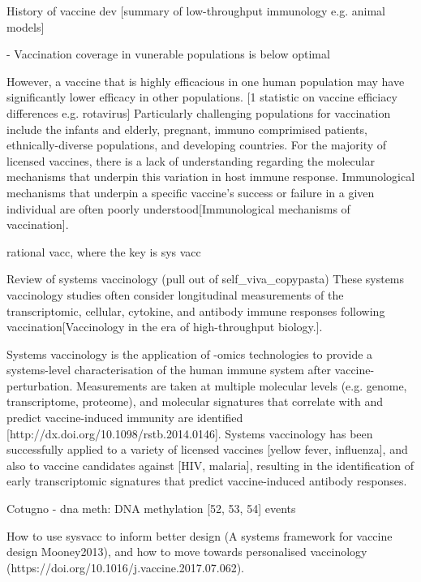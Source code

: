 \begin{outline}

    History of vaccine dev
    [summary of low-throughput immunology e.g. animal models]  

    - Vaccination coverage in vunerable populations is below optimal

    However, a vaccine that is highly efficacious in one human population may have significantly lower efficacy in other populations.
    [1 statistic on vaccine efficiacy differences e.g. rotavirus]
    Particularly challenging populations for vaccination include the infants and elderly, pregnant, immuno comprimised patients, ethnically-diverse populations, and developing countries.
    For the majority of licensed vaccines, there is a lack of understanding regarding the molecular mechanisms that underpin this variation in host immune response.
    Immunological mechanisms that underpin a specific vaccine's success or failure in a given individual are often poorly understood[Immunological mechanisms of vaccination]. 

    rational vacc, where the key is sys vacc

    Review of systems vaccinology (pull out of self\_viva\_copypasta)
    These systems vaccinology studies often consider longitudinal measurements of the transcriptomic, cellular, cytokine, and antibody immune responses following vaccination[Vaccinology in the era of high-throughput biology.].

    Systems vaccinology is the application of -omics technologies to provide a systems-level characterisation of the human immune system after vaccine-perturbation.
    Measurements are taken at multiple molecular levels (e.g. genome, transcriptome, proteome), and molecular signatures that correlate with and predict vaccine-induced immunity are identified [http://dx.doi.org/10.1098/rstb.2014.0146].
    Systems vaccinology has been successfully applied to a variety of licensed vaccines [yellow fever, influenza], and also to vaccine candidates against [HIV, malaria], resulting in the identification of early transcriptomic signatures that predict vaccine-induced antibody responses.


    Cotugno
    - dna meth: DNA methylation [52, 53, 54] events

    How to use sysvacc to inform better design (A systems framework for vaccine design Mooney2013), and how to move towards personalised vaccinology (https://doi.org/10.1016/j.vaccine.2017.07.062).


\end{outline}
